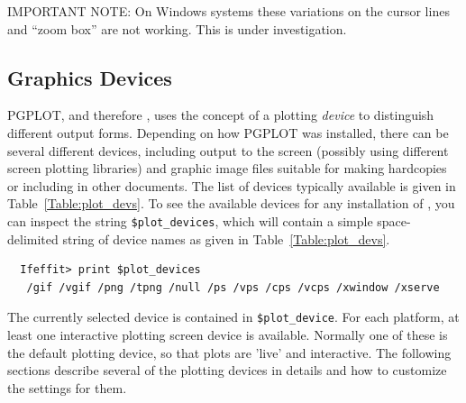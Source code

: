 IMPORTANT NOTE: On Windows systems these variations on the cursor lines and
``zoom box'' are not working.  This is under investigation.



\subsection{Graphics Devices} \label{Ch:Plot-devices}
{}

PGPLOT, and therefore {\ifeffit}, uses the concept of a plotting
{\emph{device}} to distinguish different output forms.  Depending on how
PGPLOT was installed, there can be several different devices, including
output to the screen (possibly using different screen plotting libraries)
and graphic image files suitable for making hardcopies or including in
other documents.  The list of devices typically available is given in
Table~{\ref{Table:plot_devs}}.  To see the available devices for any
installation of {\ifeffit}, you can inspect the string
{\tt{\$plot\_devices}}, which will contain a simple space-delimited string
of device names as given in Table~{\ref{Table:plot_devs}}.
\begin{verbatim}
  Ifeffit> print $plot_devices
   /gif /vgif /png /tpng /null /ps /vps /cps /vcps /xwindow /xserve
\end{verbatim}
\noindent %
The currently selected device is contained in {\tt{\$plot\_device}}.  For
each platform, at least one interactive plotting screen device is
available.  Normally one of these is the default plotting device, so that
plots are 'live' and interactive.  The following sections describe several
of the plotting devices in details and how to customize the settings for
them.

